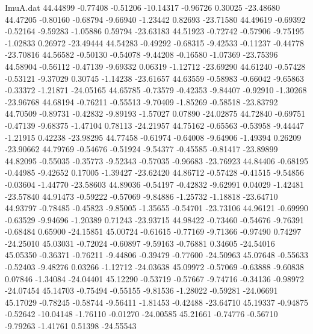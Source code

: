 \begin{filecontents}{ImuA.dat}
  44.44899   -0.77408   -0.51206  -10.14317   -0.96726    0.30025  -23.48680
  44.47205   -0.80160   -0.68794   -9.66940   -1.23442    0.82693  -23.71580
  44.49619   -0.69392   -0.52164   -9.59283   -1.05886    0.59794  -23.63183
  44.51923   -0.72742   -0.57906   -9.75195   -1.02833    0.26972  -23.49444
  44.54283   -0.49292   -0.68315   -9.42533   -0.11237   -0.44778  -23.70816
  44.56582   -0.50130   -0.54078   -9.44208   -0.16580   -1.07369  -23.75396
  44.58904   -0.56112   -0.47139   -9.69332    0.06319   -1.12712  -23.69290
  44.61240   -0.57428   -0.53121   -9.37029    0.30745   -1.14238  -23.61657
  44.63559   -0.58983   -0.66042   -9.65863   -0.33372   -1.21871  -24.05165
  44.65785   -0.73579   -0.42353   -9.84407   -0.92910   -1.30268  -23.96768
  44.68194   -0.76211   -0.55513   -9.70409   -1.85269   -0.58518  -23.83792
  44.70509   -0.89731   -0.42832   -9.89193   -1.57027    0.07890  -24.02875
  44.72840   -0.69751   -0.47139   -9.68375   -1.47104    0.78113  -24.21957
  44.75162   -0.65563   -0.53958   -9.44447   -1.21915    0.42238  -23.98295
  44.77458   -0.61974   -0.64008   -9.64906   -1.49394    0.26209  -23.90662
  44.79769   -0.54676   -0.51924   -9.54377   -0.45585   -0.81417  -23.89899
  44.82095   -0.55035   -0.35773   -9.52343   -0.57035   -0.96683  -23.76923
  44.84406   -0.68195   -0.44985   -9.42652    0.17005   -1.39427  -23.62420
  44.86712   -0.57428   -0.41515   -9.54856   -0.03604   -1.44770  -23.58603
  44.89036   -0.54197   -0.42832   -9.62991    0.04029   -1.42481  -23.57840
  44.91473   -0.59222   -0.57069   -9.84886   -1.25732   -1.18818  -23.64710
  44.93797   -0.78485   -0.45823   -9.85005   -1.35655   -0.54701  -23.73106
  44.96121   -0.69990   -0.63529   -9.94696   -1.20389    0.71243  -23.93715
  44.98422   -0.73460   -0.54676   -9.76391   -0.68484    0.65900  -24.15851
  45.00724   -0.61615   -0.77169   -9.71366   -0.97490    0.74297  -24.25010
  45.03031   -0.72024   -0.60897   -9.59163   -0.76881    0.34605  -24.54016
  45.05350   -0.36371   -0.76211   -9.44806   -0.39479   -0.77600  -24.50963
  45.07648   -0.55633   -0.52403   -9.48276    0.03266   -1.12712  -24.03638
  45.09972   -0.57069   -0.63888   -9.60838    0.07846   -1.34084  -24.04401
  45.12290   -0.53719   -0.57667   -9.74716   -0.34136   -0.98972  -24.07454
  45.14703   -0.75494   -0.55155   -9.81536   -1.28022   -0.59281  -24.06691
  45.17029   -0.78245   -0.58744   -9.56411   -1.81453   -0.42488  -23.64710
  45.19337   -0.94875   -0.52642  -10.04148   -1.76110   -0.01270  -24.00585
  45.21661   -0.74776   -0.56710   -9.79263   -1.41761    0.51398  -24.55543

\end{filecontents}
